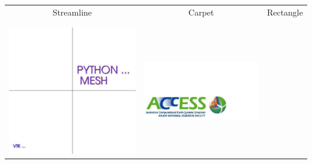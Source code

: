 \begin{table}[t]
\begin{tabular}{c c c}
Streamline & Carpet & Rectangle \\ \\ \\
\includegraphics[width=\thumbnailwidth]{figures/Text} & 
\includegraphics[width=\thumbnailwidth]{figures/Logo} & 

\end{tabular}
\end{table}
